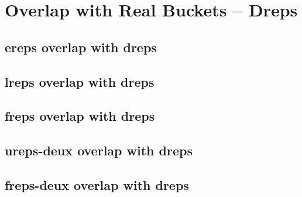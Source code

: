 \section{Overlap with Real Buckets -- Dreps}
\label{sec:tables-overx-dreps}
\subsection{ereps overlap with dreps}
\label{sub:tables-ereps-overx-dreps}

\subsection{lreps overlap with dreps}
\label{sub:tables-lreps-overx-dreps}

\subsection{freps overlap with dreps}
\label{sub:tables-freps-overx-dreps}

\subsection{ureps-deux overlap with dreps}
\label{sub:tables-ureps-deux-overx-dreps}

\subsection{freps-deux overlap with dreps}
\label{sub:tables-tables-freps-deux-overx-dreps}
